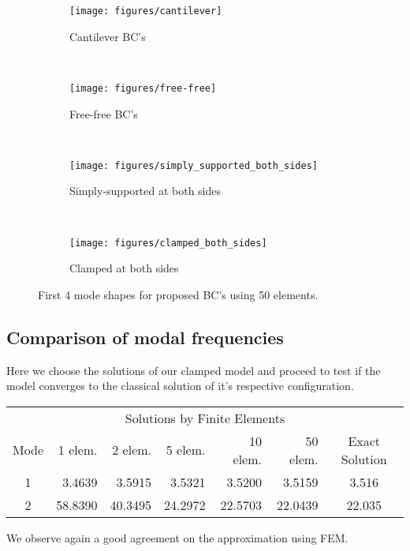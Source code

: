 \documentclass[10pt,twoside,a4paper]{article}
\begin{document}
\begin{figure}
        \centering
        \begin{subfigure}[b]{0.48\textwidth}
                \centering
                \texttt{[image: figures/cantilever]}
		\caption{Cantilever BC's}
		\label{fig:Cantilever}
        \end{subfigure}
        ~ %
        \begin{subfigure}[b]{0.48\textwidth}
                \centering
                \texttt{[image: figures/free-free]}
		\caption{Free-free BC's}
		\label{fig:Free-free}
        \end{subfigure}
        ~ %
        \begin{subfigure}[b]{0.48\textwidth}
                \centering
                \texttt{[image: figures/simply\_supported\_both\_sides]}
		\caption{Simply-supported at both sides}
		\label{fig:Simply_supported_both_sides}
        \end{subfigure}%
        ~ %
        \begin{subfigure}[b]{0.48\textwidth}
                \centering
                \texttt{[image: figures/clamped\_both\_sides]}
		\caption{Clamped at both sides}
		\label{fig:Clamped_both_sides}
        \end{subfigure}
        \caption{First 4 mode shapes for proposed BC's using 50 elements.}
	\label{fig:Mode_Shapes}
\end{figure}

\subsection{Comparison of modal frequencies}
Here we choose the solutions of our clamped model and proceed to test if the model converges to the classical solution of it's respective configuration. 
\begin{center}
  \begin{tabular}{crrrrrc}
  \hline
  \multicolumn{7}{c}{Solutions by Finite Elements} \\
  \cline{2-6}
  Mode & 1 elem.  & 2 elem. & 5 elem. & 10 elem. & 50 elem. & Exact Solution \\
  \hline
  1    & 3.4639   & 3.5915  & 3.5321  & 3.5200   & 3.5159   & 3.516  \\
  2    & 58.8390  & 40.3495 & 24.2972 & 22.5703  & 22.0439  & 22.035 \\
  \hline
  \end{tabular}
\end{center}
We observe again a good agreement on the approximation using FEM.
\end{document}
